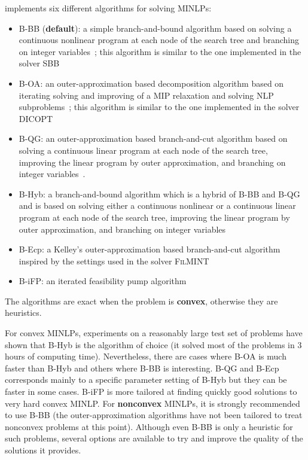 \BONMIN implements six different algorithms for solving MINLPs:
\begin{itemize}
\setlength{\partopsep}{0pt}
\setlength{\itemsep}{0pt}
\item {B-BB} (\textbf{default}): a simple branch-and-bound algorithm based on solving a continuous nonlinear program at each node of the search tree and branching on integer variables~\cite{GuptaRavindran85}; this algorithm is similar to the one implemented in the solver \textsc{SBB}
\item {B-OA}: an outer-approximation based decomposition algorithm based on iterating solving and improving of a MIP relaxation and solving NLP subproblems~\cite{DuGr86,FlLe94}; this algorithm is similar to the one implemented in the solver \textsc{DICOPT}
\item {B-QG}: an outer-approximation based branch-and-cut algorithm based on solving a continuous linear program at each node of the search tree, improving the linear program by outer approximation, and branching on integer variables~\cite{QeGr92}.
\item {B-Hyb}: a branch-and-bound algorithm which is a hybrid of B-BB and B-QG and is based on solving either a continuous nonlinear or a continuous linear program at each node of the search tree, improving the linear program by outer approximation, and branching on integer variables~\cite{BBCCGLLLMSW}
\item {B-Ecp}: a Kelley's outer-approximation based branch-and-cut algorithm inspired by the settings used in the solver \textsc{FilMINT}~\cite{AbLeLi07}
\item {B-iFP}: an iterated feasibility pump algorithm~\cite{BoCoLoMa06}
\end{itemize}
The algorithms are exact when the problem is \textbf{convex}, otherwise they are heuristics.

For convex MINLPs, experiments on a reasonably large test set of problems have shown that B-Hyb is the algorithm of choice (it solved most of the problems in 3 hours of computing time).
Nevertheless, there are cases where B-OA is much faster than B-Hyb and others where B-BB is interesting.
B-QG and B-Ecp corresponds mainly to a specific parameter setting of B-Hyb but they can be faster in some cases.
B-iFP is more tailored at finding quickly good solutions to very hard convex MINLP.
For \textbf{nonconvex} MINLPs, it is strongly recommended to use B-BB (the outer-approximation algorithms have not been tailored to treat nonconvex problems at this point).
Although even B-BB is only a heuristic for such problems, several options are available to try and improve the quality of the solutions it provides.

